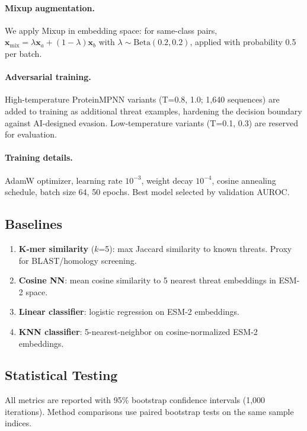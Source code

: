 \documentclass[11pt,a4paper]{article}
\begin{document}
\paragraph{Mixup augmentation.} We apply Mixup \cite{zhang2018mixup} in embedding space: for same-class pairs, $\mathbf{x}_{\text{mix}} = \lambda \mathbf{x}_a + (1-\lambda) \mathbf{x}_b$ with $\lambda \sim \text{Beta}(0.2, 0.2)$, applied with probability 0.5 per batch.

\paragraph{Adversarial training.} High-temperature ProteinMPNN variants (T=0.8, 1.0; 1,640 sequences) are added to training as additional threat examples, hardening the decision boundary against AI-designed evasion. Low-temperature variants (T=0.1, 0.3) are reserved for evaluation.

\paragraph{Training details.} AdamW optimizer, learning rate $10^{-3}$, weight decay $10^{-4}$, cosine annealing schedule, batch size 64, 50 epochs. Best model selected by validation AUROC.

\subsection{Baselines}

\begin{enumerate}[leftmargin=*]
    \item \textbf{K-mer similarity} ($k$=5): max Jaccard similarity to known threats. Proxy for BLAST/homology screening.
    \item \textbf{Cosine NN}: mean cosine similarity to 5 nearest threat embeddings in ESM-2 space.
    \item \textbf{Linear classifier}: logistic regression on ESM-2 embeddings.
    \item \textbf{KNN classifier}: 5-nearest-neighbor on cosine-normalized ESM-2 embeddings.
\end{enumerate}

\subsection{Statistical Testing}

All metrics are reported with 95\% bootstrap confidence intervals (1,000 iterations). Method comparisons use paired bootstrap tests on the same sample indices.
\end{document}
